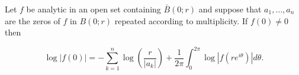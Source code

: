 Let $f$ be analytic in an open set containing $\bar{B}(0; r)$ and suppose that $a_1, \ldots, a_n$ are the zeros of $f$ in $B(0; r)$ repeated according to multiplicity. If $f(0) \neq 0$ then

$$\log |f(0)| = -\sum_{k=1}^{n} \log \left( \frac{r}{|a_k|} \right) + \frac{1}{2\pi} \int_{0}^{2\pi} \log |f(re^{i\theta})| d\theta.$$